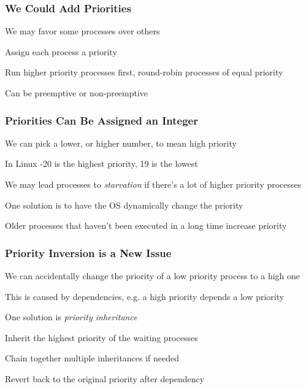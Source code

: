   \begin{frame}
    \frametitle{We Could Add Priorities}

    We may favor some processes over others

    \hspace{2em} Assign each process a priority

    \vspace{2em}

    Run higher priority processes first, round-robin processes of equal priority

    \hspace{2em} Can be preemptive or non-preemptive
  \end{frame}

  \begin{frame}
    \frametitle{Priorities Can Be Assigned an Integer}

    We can pick a lower, or higher number, to mean high priority

    \hspace{2em} In Linux -20 is the highest priority, 19 is the lowest

    \vspace{2em}

    We may lead processes to \textit{starvation} if there's a lot of higher
    priority processes

    \vspace{2em}

    One solution is to have the OS dynamically change the priority

    \hspace{2em} Older processes that haven't been executed in a long time increase priority
  \end{frame}

  \begin{frame}
    \frametitle{Priority Inversion is a New Issue}

    We can accidentally change the priority of a low priority process to a high one

    \hspace{2em} This is caused by dependencies, e.g. a high priority depends a low priority

    \vspace{2em}

    One solution is \textit{priority inheritance}

    \hspace{2em} Inherit the highest priority of the waiting processes

    \hspace{2em} Chain together multiple inheritances if needed

    \hspace{2em} Revert back to the original priority after dependency
  \end{frame}


